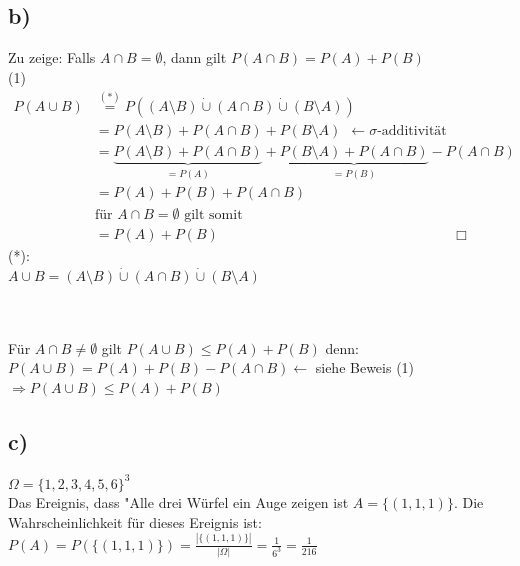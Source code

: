 \documentclass[enabledeprecatedfontcommands, a4paper]{scrartcl}
\begin{document}
\subsection*{b)}
Zu zeige: Falls $A \cap B = \emptyset$, dann gilt $P(A \cap B)=P(A)+P(B)$\\
(1)
\begin{align*}
P(A \cup B) &\overset{(*)}{=} P((A \setminus B) \dot\cup (A \cap B) \dot\cup (B \setminus A))\\
&= P(A \setminus B) + P(A \cap B) + P(B \setminus A) \ \ \leftarrow \sigma \textrm{-additivität}\\
&= \underbrace{P(A \setminus B) + P(A \cap B)}_{= P(A)} + \underbrace{P(B \setminus A) + P(A \cap B)}_{=P(B)} - P(A \cap B)\\
&= P(A) + P(B) + P(A \cap B)\\
&\textrm{für $A \cap B = \emptyset$ gilt somit}\\
&= P(A) + P(B) \hspace{7cm} \Box
\end{align*}
(*):\\
$A \cup B = (A \setminus B) \dot\cup (A \cap B) \dot\cup (B \setminus A)$\\

\\
\\
Für $A \cap B \neq \emptyset$ gilt $P(A \cup B) \le P(A)+P(B)$ denn:\\
$P(A \cup B)=P(A) +P(B) - P(A \cap B) \leftarrow$ siehe Beweis (1)\\
$\Rightarrow P(A \cup B) \le P(A)+P(B)$
\subsection*{c)}
$\Omega = \{1, 2, 3, 4, 5, 6\}^3$\\
Das Ereignis, dass "Alle drei Würfel ein Auge zeigen ist $A=\{(1, 1, 1)\}$. Die Wahrscheinlichkeit für dieses Ereignis ist: $P(A)=P(\{(1, 1, 1)\})=\frac{|\{(1, 1, 1)\}|}{|\Omega|}= \frac{1}{6^3}=\frac{1}{216}$
\newpage
\end{document}
